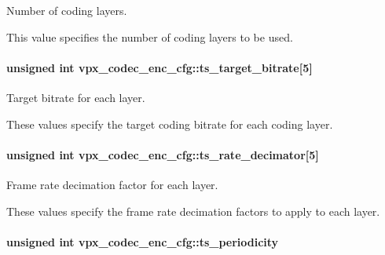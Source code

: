 Number of coding layers. 

This value specifies the number of coding layers to be used. \hypertarget{structvpx__codec__enc__cfg_aba7ceb7a90500a8f76aff89575737f3a}{
\paragraph[{ts\+\_\+target\+\_\+bitrate}]{\setlength{\rightskip}{0pt plus 5cm}unsigned int vpx\+\_\+codec\+\_\+enc\+\_\+cfg\+::ts\+\_\+target\+\_\+bitrate\mbox{[}5\mbox{]}}}\label{structvpx__codec__enc__cfg_aba7ceb7a90500a8f76aff89575737f3a}


Target bitrate for each layer. 

These values specify the target coding bitrate for each coding layer. \hypertarget{structvpx__codec__enc__cfg_ad40c30846ef8ef1d8684f10a491ec535}{
\paragraph[{ts\+\_\+rate\+\_\+decimator}]{\setlength{\rightskip}{0pt plus 5cm}unsigned int vpx\+\_\+codec\+\_\+enc\+\_\+cfg\+::ts\+\_\+rate\+\_\+decimator\mbox{[}5\mbox{]}}}\label{structvpx__codec__enc__cfg_ad40c30846ef8ef1d8684f10a491ec535}


Frame rate decimation factor for each layer. 

These values specify the frame rate decimation factors to apply to each layer. \hypertarget{structvpx__codec__enc__cfg_a4ec338780115dd270acf0dac24193474}{
\paragraph[{ts\+\_\+periodicity}]{\setlength{\rightskip}{0pt plus 5cm}unsigned int vpx\+\_\+codec\+\_\+enc\+\_\+cfg\+::ts\+\_\+periodicity}}\label{structvpx__codec__enc__cfg_a4ec338780115dd270acf0dac24193474}


